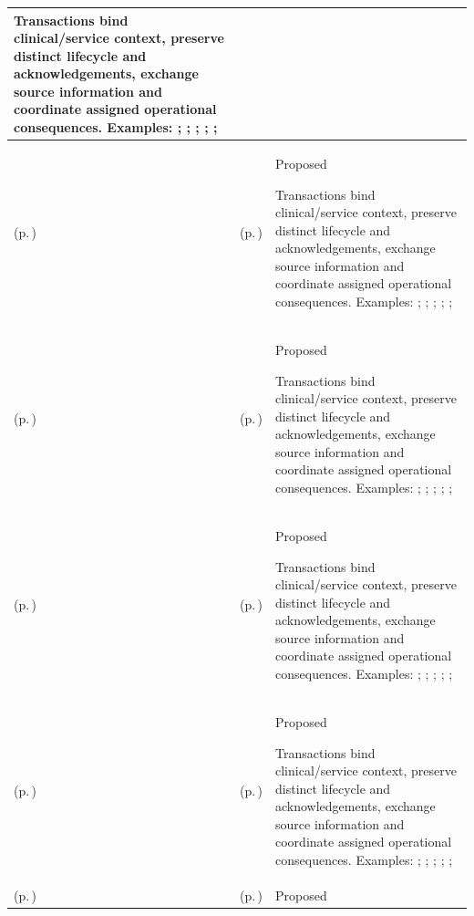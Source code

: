 \begin{longtable}{|>{\raggedright\arraybackslash}p{0.27\TableWidth}|>{\raggedright\arraybackslash}p{0.27\TableWidth}|>{\raggedright\arraybackslash}p{0.46\TableWidth}|}
Transactions bind clinical/service context, preserve distinct lifecycle and acknowledgements, exchange source information and coordinate assigned operational consequences. Examples: \nameref{feature:feat-sa-11}; \nameref{feature:feat-sa-12}; \nameref{feature:feat-sa-13}; \nameref{feature:feat-sa-14}; \nameref{function:receive-order-request}; \nameref{service:order-requisition-ingress}\\\hline
\nameref{cap:bec-order-administration} (p.\,\pageref{cap:bec-order-administration}) & \nameref{cap:ec-03} (p.\,\pageref{cap:ec-03}) & Proposed

Transactions bind clinical/service context, preserve distinct lifecycle and acknowledgements, exchange source information and coordinate assigned operational consequences. Examples: \nameref{feature:feat-sa-11}; \nameref{feature:feat-sa-12}; \nameref{feature:feat-sa-13}; \nameref{feature:feat-sa-14}; \nameref{function:receive-order-request}; \nameref{service:order-requisition-ingress}\\\hline
\nameref{cap:bec-order-administration} (p.\,\pageref{cap:bec-order-administration}) & \nameref{cap:ec-08} (p.\,\pageref{cap:ec-08}) & Proposed

Transactions bind clinical/service context, preserve distinct lifecycle and acknowledgements, exchange source information and coordinate assigned operational consequences. Examples: \nameref{feature:feat-sa-11}; \nameref{feature:feat-sa-12}; \nameref{feature:feat-sa-13}; \nameref{feature:feat-sa-14}; \nameref{function:receive-order-request}; \nameref{service:order-requisition-ingress}\\\hline
\nameref{cap:bec-order-administration} (p.\,\pageref{cap:bec-order-administration}) & \nameref{cap:ec-10} (p.\,\pageref{cap:ec-10}) & Proposed

Transactions bind clinical/service context, preserve distinct lifecycle and acknowledgements, exchange source information and coordinate assigned operational consequences. Examples: \nameref{feature:feat-sa-11}; \nameref{feature:feat-sa-12}; \nameref{feature:feat-sa-13}; \nameref{feature:feat-sa-14}; \nameref{function:receive-order-request}; \nameref{service:order-requisition-ingress}\\\hline
\nameref{cap:bec-diagnostic-administration} (p.\,\pageref{cap:bec-diagnostic-administration}) & \nameref{cap:ec-02} (p.\,\pageref{cap:ec-02}) & Proposed

Transactions bind clinical/service context, preserve distinct lifecycle and acknowledgements, exchange source information and coordinate assigned operational consequences. Examples: \nameref{feature:feat-sa-15}; \nameref{feature:feat-sa-16}; \nameref{feature:feat-sa-17}; \nameref{function:correlate-diagnostic-request}; \nameref{service:diagnostic-correlation-resolution}; \nameref{function:bind-diagnostic-report}\\\hline
\nameref{cap:bec-diagnostic-administration} (p.\,\pageref{cap:bec-diagnostic-administration}) & \nameref{cap:ec-03} (p.\,\pageref{cap:ec-03}) & Proposed


\end{longtable}
